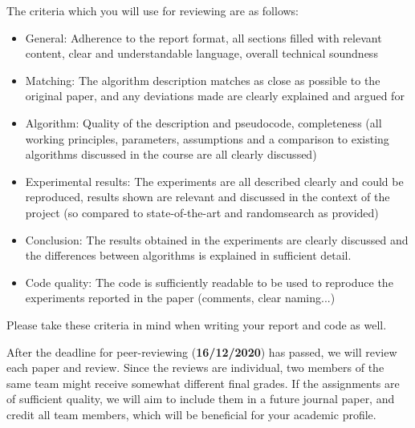 \documentclass[runningheads]{llncs}
\begin{document}
The criteria which you will use for reviewing are as follows:
\begin{itemize}
    \item General: Adherence to the report format, all sections filled with relevant content, clear and understandable language, overall technical soundness
\item Matching: The algorithm description matches as close as possible to the original paper, and any deviations made are clearly explained and argued for
\item Algorithm: Quality of the description and pseudocode, completeness (all working principles, parameters, assumptions and a comparison to existing algorithms discussed in the course are all clearly discussed)
\item Experimental results: The experiments are all described clearly and could be reproduced, results shown are relevant and discussed in the context of the project (so compared to state-of-the-art and randomsearch as provided)
\item Conclusion: The results obtained in the experiments are clearly discussed and the differences between algorithms is explained in sufficient detail.
\item Code quality: The code is sufficiently readable to be used to reproduce the experiments reported in the paper (comments, clear naming...)
\end{itemize}
Please take these criteria in mind when writing your report and code as well.

After the deadline for peer-reviewing (\textbf{16/12/2020}) has passed, we will review each paper and review. Since the reviews are individual, two members of the same team might receive somewhat different final grades. If the assignments are of sufficient quality, we will aim to include them in a future journal paper, and credit all team members, which will be beneficial for your academic profile.





\appendix
\end{document}
